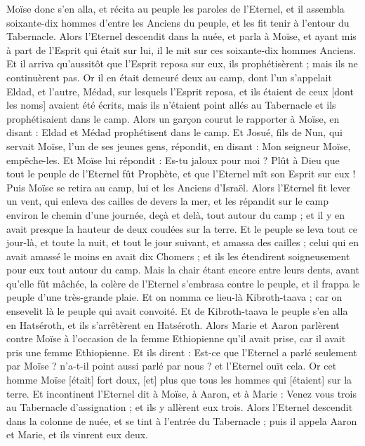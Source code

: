 \begin{multicols}{2}
Moïse donc s'en alla, et récita au peuple les paroles de l'Eternel, et il assembla soixante-dix hommes d'entre les Anciens du peuple, et les fit tenir à l'entour du Tabernacle.
Alors l'Eternel descendit dans la nuée, et parla à Moïse, et ayant mis à part de l'Esprit qui était sur lui, il le mit sur ces soixante-dix hommes Anciens. Et il arriva qu'aussitôt que l'Esprit reposa sur eux, ils prophétisèrent ; mais ils ne continuèrent pas.
Or il en était demeuré deux au camp, dont l'un s'appelait Eldad, et l'autre, Médad, sur lesquels l'Esprit reposa, et ils étaient de ceux [dont les noms] avaient été écrits, mais ils n'étaient point allés au Tabernacle et ils prophétisaient dans le camp.
Alors un garçon courut le rapporter à Moïse, en disant : Eldad et Médad prophétisent dans le camp.
Et Josué, fils de Nun, qui servait Moïse, l'un de ses jeunes gens, répondit, en disant : Mon seigneur Moïse, empêche-les.
Et Moïse lui répondit : Es-tu jaloux pour moi ? Plût à Dieu que tout le peuple de l'Eternel fût Prophète, et que l'Eternel mît son Esprit sur eux !
Puis Moïse se retira au camp, lui et les Anciens d'Israël.
Alors l'Eternel fit lever un vent, qui enleva des cailles de devers la mer, et les répandit sur le camp environ le chemin d'une journée, deçà et delà, tout autour du camp ; et il y en avait presque la hauteur de deux coudées sur la terre.
Et le peuple se leva tout ce jour-là, et toute la nuit, et tout le jour suivant, et amassa des cailles ; celui qui en avait amassé le moins en avait dix Chomers ; et ils les étendirent soigneusement pour eux tout autour du camp.
Mais la chair étant encore entre leurs dents, avant qu'elle fût mâchée, la colère de l'Eternel s'embrasa contre le peuple, et il frappa le peuple d'une très-grande plaie.
Et on nomma ce lieu-là Kibroth-taava ; car on ensevelit là le peuple qui avait convoité.
Et de Kibroth-taava le peuple s'en alla en Hatséroth, et ils s'arrêtèrent en Hatséroth.
\VerseOne{}Alors Marie et Aaron parlèrent contre Moïse à l'occasion de la femme Ethiopienne qu'il avait prise, car il avait pris une femme Ethiopienne.
Et ils dirent : Est-ce que l'Eternel a parlé seulement par Moïse ? n'a-t-il point aussi parlé par nous ? et l'Eternel ouït cela.
Or cet homme Moïse [était] fort doux, [et] plus que tous les hommes qui [étaient] sur la terre.
Et incontinent l'Eternel dit à Moïse, à Aaron, et à Marie : Venez vous trois au Tabernacle d'assignation ; et ils y allèrent eux trois.
Alors l'Eternel descendit dans la colonne de nuée, et se tint à l'entrée du Tabernacle ; puis il appela Aaron et Marie, et ils vinrent eux deux.

\end{multicols}
